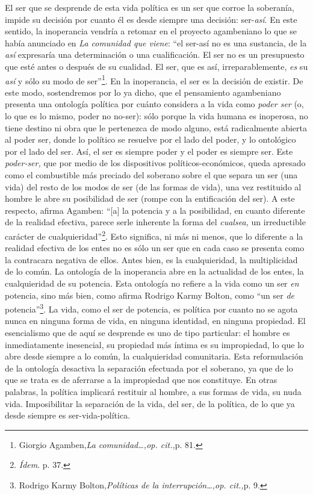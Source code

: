 El ser que se desprende de esta vida política es un ser que corroe la soberanía, impide su decisión por cuanto él es desde siempre una decisión: ser-\emph{así}. En este sentido, la inoperancia vendría a retomar en el proyecto agambeniano lo que se había anunciado en \emph{La comunidad que viene}: \enquote{el ser-así no es una sustancia, de la \emph{así} expresaría una determinación o una cualificación. El ser no es un presupuesto que esté antes o después de su cualidad. El ser, que es así, irreparablemente, \emph{es} su \emph{así} y sólo su modo de ser}\footnote{Giorgio Agamben,\emph{La comunidad\ldots,op. cit.,}p. 81.}. En la inoperancia, el ser es la decisión de existir. De este modo, sostendremos por lo ya dicho, que el pensamiento agambeniano presenta una ontología política por cuánto considera a la vida como \emph{poder ser} (o, lo que es lo mismo, poder no no-ser): sólo porque la vida humana es inoperosa, no tiene destino ni obra que le pertenezca de modo alguno, está radicalmente abierta al poder ser, donde lo político se resuelve por el lado del poder, y lo ontológico por el lado del ser. Así, el ser es siempre poder y el poder es siempre ser. Este \emph{poder-ser,} que por medio de los dispositivos políticos-económicos, queda apresado como el combustible más preciado del soberano sobre el que separa un ser (una vida) del resto de los modos de ser (de las formas de vida), una vez restituido al hombre le abre su posibilidad de ser (rompe con la entificación del ser). A este respecto, afirma Agamben: \enquote{{[}a{]} la potencia y a la posibilidad, en cuanto diferente de la realidad efectiva, parece serle inherente la forma del \emph{cualsea,} un irreductible carácter de cualquieridad}\footnote{\emph{Ídem}. p. 37.}. Esto significa, ni más ni menos, que lo diferente a la realidad efectiva de los entes no es sólo un ser que en cada caso se presenta como la contracara negativa de ellos. Antes bien, es la cualquieridad, la multiplicidad de lo común. La ontología de la inoperancia abre en la actualidad de los entes, la cualquieridad de su potencia. Esta ontología no refiere a la vida como un ser \emph{en} potencia, sino más bien, como afirma Rodrigo Karmy Bolton, como \enquote{un ser \emph{de} potencia}\footnote{Rodrigo Karmy Bolton,\emph{Políticas de la interrupción\ldots,op. cit.,}p. 9.}. La vida, como el ser de potencia, es política por cuanto no se agota nunca en ninguna forma de vida, en ninguna identidad, en ninguna propiedad. El esencialismo que de aquí se desprende es uno de tipo particular: el hombre es inmediatamente inesencial, su propiedad más íntima es su impropiedad, lo que lo abre desde siempre a lo común, la cualquieridad comunitaria. Esta reformulación de la ontología desactiva la separación efectuada por el soberano, ya que de lo que se trata es de aferrarse a la impropiedad que nos constituye. En otras palabras, la política implicará restituir al hombre, a sus formas de vida, su nuda vida. Imposibilitar la separación de la vida, del ser, de la política, de lo que ya desde siempre es ser-vida-política.

